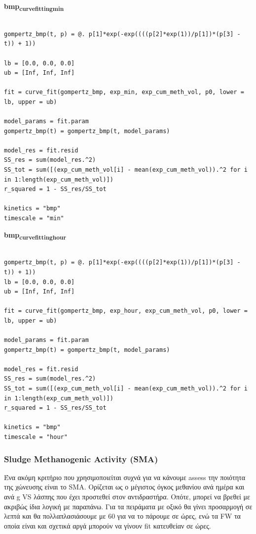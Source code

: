 \documentclass[11pt]{article}
\begin{document}
\textbf{bmp\textsubscript{curve}\textsubscript{fitting}\textsubscript{min}}
\begin{verbatim}

gompertz_bmp(t, p) = @. p[1]*exp(-exp((((p[2]*exp(1))/p[1])*(p[3] - t)) + 1))

lb = [0.0, 0.0, 0.0]
ub = [Inf, Inf, Inf]

fit = curve_fit(gompertz_bmp, exp_min, exp_cum_meth_vol, p0, lower = lb, upper = ub)

model_params = fit.param
gompertz_bmp(t) = gompertz_bmp(t, model_params)

model_res = fit.resid
SS_res = sum(model_res.^2)
SS_tot = sum([(exp_cum_meth_vol[i] - mean(exp_cum_meth_vol)).^2 for i in 1:length(exp_cum_meth_vol)])
r_squared = 1 - SS_res/SS_tot

kinetics = "bmp"
timescale = "min"
\end{verbatim}


\textbf{bmp\textsubscript{curve}\textsubscript{fitting}\textsubscript{hour}}
\begin{verbatim}

gompertz_bmp(t, p) = @. p[1]*exp(-exp((((p[2]*exp(1))/p[1])*(p[3] - t)) + 1))
lb = [0.0, 0.0, 0.0]
ub = [Inf, Inf, Inf]

fit = curve_fit(gompertz_bmp, exp_hour, exp_cum_meth_vol, p0, lower = lb, upper = ub)

model_params = fit.param
gompertz_bmp(t) = gompertz_bmp(t, model_params)

model_res = fit.resid
SS_res = sum(model_res.^2)
SS_tot = sum([(exp_cum_meth_vol[i] - mean(exp_cum_meth_vol)).^2 for i in 1:length(exp_cum_meth_vol)])
r_squared = 1 - SS_res/SS_tot

kinetics = "bmp"
timescale = "hour"
\end{verbatim}

\subsubsection{Sludge Methanogenic Activity (SMA)}
\label{sec:org4f33b34}
Ένα ακόμη κριτήριο που χρησιμοποιείται συχνά για να κάνουμε assess την ποιότητα της χώνευσης είναι το SMA. Ορίζεται ως ο μέγιστος όγκος μεθανίου ανά ημέρα και ανά g VS λάσπης που έχει προστεθεί στον αντιδραστήρα. Οπότε, μπορεί να βρεθεί με ακριβώς ίδια λογική με παραπάνω. Για τα πειράματα με οξικό θα γίνει προσαρμογή σε λεπτά και θα πολλαπλασιάσουμε με 60 για να το πάρουμε σε ώρες, ενώ τα FW τα οποία είναι και σχετικά αργά μπορούν να γίνουν fit κατευθείαν σε ώρες.
\end{document}
